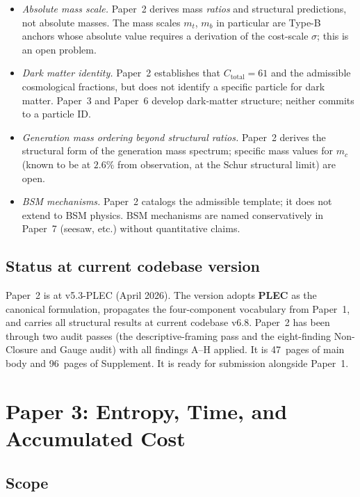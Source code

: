 \documentclass[11pt]{article}
\newcommand{\PLEC}{\textbf{PLEC}}
\begin{document}
\begin{itemize}
    \item \emph{Absolute mass scale.} Paper~2 derives mass \emph{ratios} and structural predictions, not absolute masses. The mass scales $m_t$, $m_b$ in particular are Type-B anchors whose absolute value requires a derivation of the cost-scale $\sigma$; this is an open problem.
    \item \emph{Dark matter identity.} Paper~2 establishes that $C_{\mathrm{total}} = 61$ and the admissible cosmological fractions, but does not identify a specific particle for dark matter. Paper~3 and Paper~6 develop dark-matter structure; neither commits to a particle ID.
    \item \emph{Generation mass ordering beyond structural ratios.} Paper~2 derives the structural form of the generation mass spectrum; specific mass values for $m_c$ (known to be at $2.6\%$ from observation, at the Schur structural limit) are open.
    \item \emph{BSM mechanisms.} Paper~2 catalogs the admissible template; it does not extend to BSM physics. BSM mechanisms are named conservatively in Paper~7 (seesaw, etc.) without quantitative claims.
\end{itemize}

\subsection{Status at current codebase version}\label{sec:P2_status}

Paper~2 is at v5.3-PLEC (April 2026). The version adopts \PLEC{} as the canonical formulation, propagates the four-component vocabulary from Paper~1, and carries all structural results at current codebase v6.8. Paper~2 has been through two audit passes (the descriptive-framing pass and the eight-finding Non-Closure and Gauge audit) with all findings A--H applied. It is 47~pages of main body and 96~pages of Supplement. It is ready for submission alongside Paper~1.

\clearpage

\section{Paper 3: Entropy, Time, and Accumulated Cost}\label{sec:P3}

\subsection{Scope}\label{sec:P3_scope}
\end{document}

